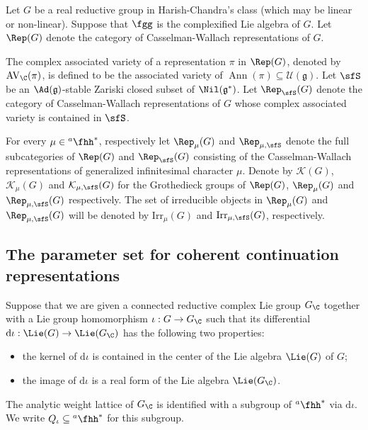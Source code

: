 \documentclass[12pt]{amsart}
\newcommand{\AV}{\mathrm{AV}}
\def\subset{\subseteq}
\newcommand{\CK}{{\mathcal {K}}}
\newcommand{\CU}{{\mathcal {U}}}
\DeclareMathOperator{\Ann}{Ann}
\newcommand{\g}{\mathfrak g}
\numberwithin{equation}{section}
\theoremstyle{remark}
\def\Irr{\mathrm{Irr}}
\def\hha{{}^a\fhh}
\begin{document}
Let $G$ be a real reductive group in Harish-Chandra's class (which may be
linear or non-linear). Suppose that $\fgg$ is the complexified Lie algebra of $G$.
Let $\Rep(G)$ denote the category of Casselman-Wallach representations of $G$.

The complex associated variety of a representation $\pi$ in $\Rep(G)$,
denoted by $\AV_\C(\pi)$, is defined to be the associated variety of $\Ann(\pi)\subset \CU(\g)$.
Let $\sfS$ be  an $\Ad(\g)$-stable Zariski closed subset   of $\Nil(\g^*)$. Let $\Rep_\sfS(G)$ denote the
category of Casselman-Wallach representations of $G$ whose complex associated
variety is contained in $\sfS$.


For every $\mu\in \hha^*$,
respectively let $\Rep_\mu(G)$ and $\Rep_{\mu,\sfS}$ denote the full subcategories of  $\Rep(G)$ and $\Rep_{\sfS}(G)$ consisting
of the Casselman-Wallach representations of generalized infinitesimal character $\mu$.
Denote by $\CK(G)$, $\CK_\mu(G)$ and  $\CK_{\mu, \sfS}(G)$ for the Grothedieck groups of
$\Rep(G)$, $\Rep_{\mu}(G)$ and $\Rep_{\mu, \sfS}(G)$ respectively.
The set of irreducible objects in $\Rep_{\mu}(G)$ and $\Rep_{\mu, \sfS}(G)$ will be denoted by $\Irr_{\mu}(G)$ and $\Irr_{\mu, \sfS}(G)$, respectively.


\subsection{The parameter set for coherent continuation representations}\label{extcoh}

Suppose that we are given a connected reductive complex Lie group $G_\C$ together with a Lie group homomorphism $\iota: G\rightarrow G_\C$ such that its differential $\mathrm d \iota: \Lie(G)\rightarrow \Lie(G_\C)$ has the following two properties:
\begin{itemize}
  \item the kernel of $\mathrm d \iota$ is contained in the center of the Lie algebra $ \Lie(G)$ of $G$;
  \item the image of  $\mathrm d \iota$ is a real form  of the Lie algebra $ \Lie(G_\C)$.
\end{itemize}
The  analytic weight lattice of $ G_\C$ is identified with a subgroup of $\hha^*$ via $\mathrm d\iota$. We write $Q_\iota\subset \hha^*$ for this subgroup.
\end{document}
